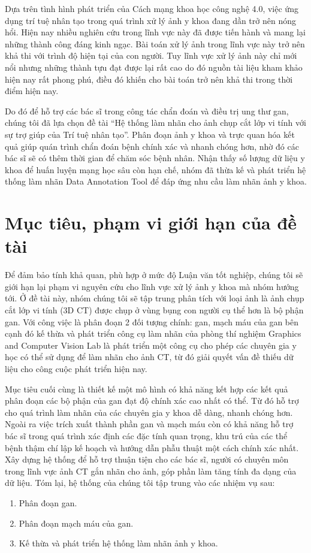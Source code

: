 Dựa trên tình hình phát triển của Cách mạng khoa học công nghệ 4.0, việc ứng dụng trí tuệ nhân tạo trong quá trình xử lý ảnh y khoa đang dần trở nên nóng hổi. Hiện nay nhiều nghiên cứu trong lĩnh vực này đã được tiến hành và mang lại những thành công đáng kinh ngạc. Bài toán xử lý ảnh trong lĩnh vực này trở nên khả thi với trình độ hiện tại của con người. Tuy lĩnh vực xử lý ảnh này chỉ mới nổi nhưng những thành tựu đạt được lại rất cao do đó nguồn tài liệu kham khảo hiện nay rất phong phú, điều đó khiến cho bài toán trở nên khả thi trong thời điểm hiện nay.\par

Do đó để hỗ trợ các bác sĩ trong công tác chẩn đoán và điều trị ung thư gan, chúng tôi đã lựa chọn đề tài ``Hệ thống làm nhãn cho ảnh chụp cắt lớp vi tính với sự trợ giúp của Trí tuệ nhân tạo''. Phân đoạn ảnh y khoa và trực quan hóa kết quả giúp quán trình chẩn đoán bệnh chính xác và nhanh chóng hơn, nhờ đó các bác sĩ sẽ có thêm thời gian để chăm sóc bệnh nhân. Nhận thấy số lượng dữ liệu y khoa để huấn luyện mạng học sâu còn hạn chế, nhóm đã thừa kế và phát triển hệ thống làm nhãn Data Annotation Tool để đáp ứng nhu cầu làm nhãn ảnh y khoa.\par

\section{Mục tiêu, phạm vi giới hạn của đề tài}
Để đảm bảo tính khả quan, phù hợp ở mức độ Luận văn tốt nghiệp, chúng tôi sẽ giới hạn lại phạm vi nguyên cứu cho lĩnh vực xử lý ảnh y khoa mà nhóm hướng tới. Ở đề tài này, nhóm chúng tôi sẽ tập trung phân tích với loại ảnh là ảnh chụp cắt lớp vi tính (3D CT) được chụp ở vùng bụng con người cụ thể hơn là bộ phận gan. Với công việc là phân đoạn 2 đối tượng chính: gan, mạch máu của gan bên cạnh đó kế thừa và phát triển công cụ làm nhãn của phòng thí nghiệm Graphics and Computer Vision Lab là phát triển một công cụ cho phép các chuyên gia y học có thể sử dụng để làm nhãn cho ảnh CT, từ đó giải quyết vấn đề thiếu dữ liệu cho công cuộc phát triển hiện nay. 

Mục tiêu cuối cùng là thiết kế một mô hình có khả năng kết hợp các kết quả phân đoạn các bộ phận của gan đạt độ chính xác cao nhất có thể. Từ đó hỗ trợ cho quá trình làm nhãn của các chuyên gia y khoa dễ dàng, nhanh chóng hơn. Ngoài ra việc trích xuất thành phần gan và mạch máu còn có khả năng hỗ trợ bác sĩ trong quá trình xác định các đặc tính quan trọng, khu trú của các thể bệnh thậm chí lập kế hoạch và hướng dẫn phẫu thuật một cách chính xác nhất. Xây dựng hệ thống để hỗ trợ thuận tiện cho các bác sĩ, người có chuyên môn trong lĩnh vực ảnh CT gắn nhãn cho ảnh, góp phần làm tăng tính đa dạng của dữ liệu. Tóm lại, hệ thống của chúng tôi tập trung vào các nhiệm vụ sau:
\begin{enumerate}[topsep=0pt,itemsep=0ex]
    \item Phân đoạn gan.
    \item Phân đoạn mạch máu của gan.
    \item Kế thừa và phát triển hệ thống làm nhãn ảnh y khoa.
\end{enumerate}

